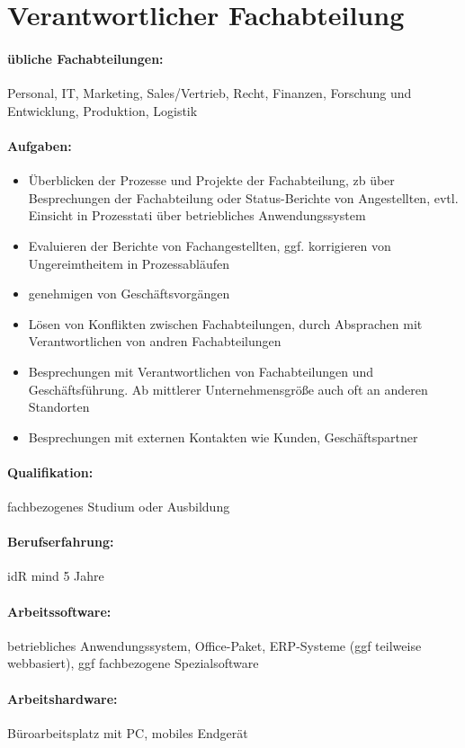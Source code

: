 \documentclass[11pt,oneside,a4paper,notitlepage]{article}
\begin{document}
%
%
\section{Verantwortlicher Fachabteilung}

\paragraph*{übliche Fachabteilungen: } Personal, IT, Marketing, Sales/Vertrieb, Recht, Finanzen, Forschung und Entwicklung, Produktion, Logistik

\paragraph*{Aufgaben: }
\begin{itemize}
\item Überblicken der Prozesse und Projekte der Fachabteilung, zb über Besprechungen der Fachabteilung oder Status-Berichte von Angestellten, evtl. Einsicht in Prozesstati über betriebliches Anwendungssystem
\item Evaluieren der Berichte von Fachangestellten, ggf. korrigieren von Ungereimtheitem in Prozessabläufen
\item genehmigen von Geschäftsvorgängen
\item Lösen von Konflikten zwischen Fachabteilungen, durch Absprachen mit Verantwortlichen von andren Fachabteilungen
\item Besprechungen mit Verantwortlichen von Fachabteilungen und Geschäftsführung. Ab mittlerer Unternehmensgröße auch oft an anderen Standorten
\item Besprechungen mit externen Kontakten wie Kunden, Geschäftspartner
\end{itemize}
\noindent

\paragraph*{Qualifikation: } fachbezogenes Studium oder Ausbildung

%
\paragraph*{Berufserfahrung: } idR mind 5 Jahre

%
\paragraph*{Arbeitssoftware: } betriebliches Anwendungssystem, Office-Paket, ERP-Systeme (ggf teilweise webbasiert), ggf fachbezogene Spezialsoftware

%
\paragraph*{Arbeitshardware: } Büroarbeitsplatz mit PC, mobiles Endgerät


%
\end{document}
